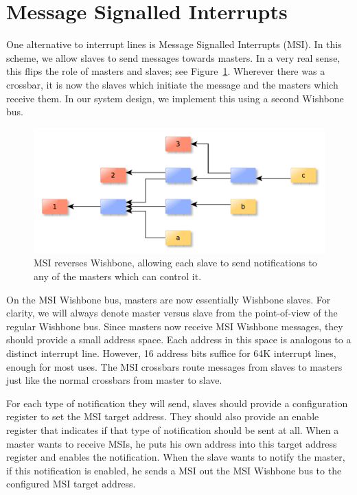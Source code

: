 \documentclass[a4paper]{jacow}
\begin{document}
\section{Message Signalled Interrupts}

One alternative to interrupt lines is Message Signalled Interrupts (MSI).
In this scheme, we allow slaves to send messages towards masters.
In a very real sense, this flips the role of masters and slaves;
see Figure~\ref{fig:good-msi}.
Wherever there was a crossbar, it is now the slaves which initiate the
message and the masters which receive them.
In our system design,
we implement this using a second Wishbone bus.

\begin{figure}[t]
  \centering
  \includegraphics*[width=\columnwidth]{THHA2O03f5}
  \caption{MSI reverses Wishbone, allowing each slave to send notifications to
  any of the masters which can control it.}
  \label{fig:good-msi}
\end{figure}

On the MSI Wishbone bus, masters are now essentially Wishbone slaves.
For clarity, we will always denote master versus slave from the point-of-view of
the regular Wishbone bus.
Since masters now receive MSI Wishbone messages, they should provide a small address space.
Each address in this space is analogous to a distinct interrupt line.
However, 16 address bits suffice for 64K interrupt lines, enough for most uses.
The MSI crossbars route messages from slaves to masters just like the normal
crossbars from master to slave.

For each type of notification they will send,
slaves should provide a configuration register to set the MSI target address.
They should also provide an enable register that indicates if that type of
notification should be sent at all.
When a master wants to receive MSIs, he puts his own address into this
target address register and enables the notification.
When the slave wants to notify the master, if this notification is enabled,
he sends a MSI out the MSI Wishbone bus to the configured MSI target address.
\end{document}
